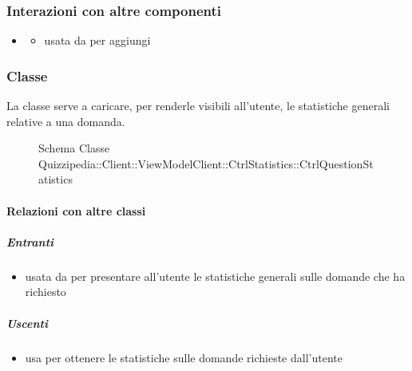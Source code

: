 \subsubsection{Interazioni con altre componenti}
\begin{itemize}
\item {}
\begin{itemize}
\item usata da  per aggiungi
\end{itemize}
\end{itemize}
\subsubsection{Classe }
La classe serve a caricare, per renderle visibili all'utente, le statistiche generali relative a una domanda.
\begin{figure}[H]
\centering
\noindent{}
\caption[Schema Classe CtrlQuestionStatistics]{Schema Classe Quizzipedia::Client::ViewModelClient::CtrlStatistics::CtrlQuestionStatistics}
\end{figure}
\paragraph{Relazioni con altre classi}
\subparagraph{Entranti}
\begin{itemize}
\item usata da  per presentare all'utente le statistiche generali sulle domande che ha richiesto
\end{itemize}
\subparagraph{Uscenti}
\begin{itemize}
\item usa  per ottenere le statistiche sulle domande richieste dall'utente
\end{itemize}
